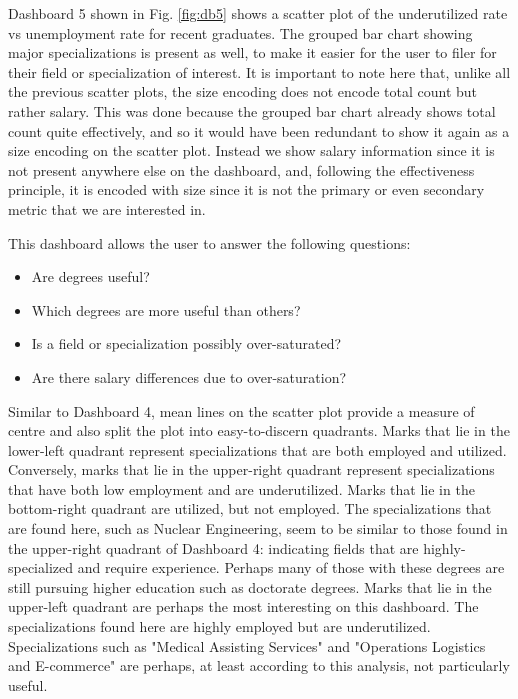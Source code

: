 \documentclass[sigchi]{acmart}
\begin{document}
Dashboard 5 shown in Fig. \ref{fig:db5} shows a scatter plot of the underutilized rate vs unemployment rate for recent graduates. The grouped bar chart showing major specializations is present as well, to make it easier for the user to filer for their field or specialization of interest. It is important to note here that, unlike all the previous scatter plots, the size encoding does not encode total count but rather salary. This was done because the grouped bar chart already shows total count quite effectively, and so it would have been redundant to show it again as a size encoding on the scatter plot. Instead we show salary information since it is not present anywhere else on the dashboard, and, following the effectiveness principle, it is encoded with size since it is not the primary or even secondary metric that we are interested in.

This dashboard allows the user to answer the following questions:
\begin{itemize}
\item{Are degrees useful?}
\item{Which degrees are more useful than others?}
\item{Is a field or specialization possibly over-saturated?}
\item{Are there salary differences due to over-saturation?}
\end{itemize}

Similar to Dashboard 4, mean lines on the scatter plot provide a measure of centre and also split the plot into easy-to-discern quadrants. Marks that lie in the lower-left quadrant represent specializations that are both employed and utilized. Conversely, marks that lie in the upper-right quadrant represent specializations that have both low employment and are underutilized. Marks that lie in the bottom-right quadrant are utilized, but not employed. The specializations that are found here, such as Nuclear Engineering, seem to be similar to those found in the upper-right quadrant of Dashboard 4: indicating fields that are highly-specialized and require experience. Perhaps many of those with these degrees are still pursuing higher education such as doctorate degrees. Marks that lie in the upper-left quadrant are perhaps the most interesting on this dashboard. The specializations found here are highly employed but are underutilized. Specializations such as "Medical Assisting Services" and "Operations Logistics and E-commerce" are perhaps, at least according to this analysis, not particularly useful.
\end{document}
